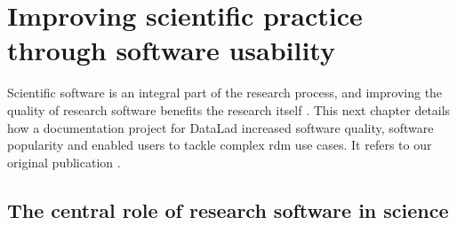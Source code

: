
\renewcommand*\dictumwidth{0.5\linewidth}

\chapter{Improving scientific practice through software usability}
\label{chap:k2}



Scientific software is an integral part of the research process, and improving the quality of research software benefits the research itself \citep{goble2014better}.
This next chapter details how a documentation project for DataLad increased software quality, software popularity and enabled users to tackle complex \gls{rdm} use cases.
It refers to our original publication \citep{wagner2020datalad}.


\section{The central role of research software in science}


